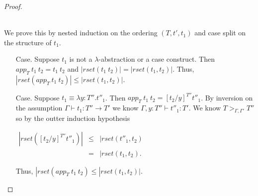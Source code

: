 \begin{proof}
\begin{itemize}
  \ \\
  We prove this by nested induction on the ordering $(T, t', t_1)$ and case split on the structure of $t_1$. 
  
  \begin{itemize}
  \item[Case.] Suppose $t_1$ is not a $\lambda$-abstraction or a case construct.  Then
    $app_T\ t_1\ t_2 = t_1\ t_2$ and $|rset(t_1\ t_2)| = |rset(t_1,t_2)|$.  Thus,
    $|rset(app_T\ t_1\ t_2)| \leq |rset(t_1,t_2)|$.  
    
  \item[Case.] Suppose $t_1 \equiv \lambda y:T''.t''_1$.  Then $app_T\ t_1\ t_2 = [t_2/y]^{T''} t''_1$.
    By inversion on the assumption $\Gamma \vdash t_1:T'' \to T'$ we know $\Gamma,y:T'' \vdash t''_1:T'$.  
    We know $T >_{\Gamma,\Gamma'} T''$ so by the outter induction hypothesis 
    \begin{center}
      \begin{math}
        \begin{array}{lll}
          |rset([t_2/y]^{T''} t''_1)| & \leq & |rset(t''_1,t_2)\\
          & =    & |rset(t_1,t_2).
        \end{array}
      \end{math}
    \end{center}
    Thus, $|rset(app_T\ t_1\ t_2) \leq |rset(t_1,t_2)|$.
    

\end{itemize}
\end{itemize}
\end{proof}
